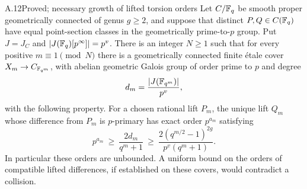 \begin{claim}{A.12}{Proved; necessary growth of lifted torsion orders}
Let $C/\mathbb F_q$ be smooth proper geometrically connected of genus
$g\ge2$, and suppose that distinct $P,Q\in C(\mathbb F_q)$ have equal
point-section classes in the geometrically prime-to-$p$ group.
Put $J=J_C$ and $|J(\mathbb F_q)[p^\infty]|=p^v$. There is an integer
$N\ge1$ such that for every positive $m\equiv1\pmod N$ there is
a geometrically connected finite \'etale cover
$X_m\to C_{\mathbb F_{q^m}}$, with abelian geometric Galois group of
order prime to $p$ and degree
\[
 d_m=\frac{|J(\mathbb F_{q^m})|}{p^v},
\]
with the following property. For a chosen rational lift $P_m$,
the unique lift $Q_m$ whose difference from $P_m$ is
$p$-primary has exact order $p^{a_m}$ satisfying
\[
 p^{a_m}\ \ge\ \frac{2d_m}{q^m+1}
 \ \ge\ \frac{2(q^{m/2}-1)^{2g}}{p^v(q^m+1)}.                    \tag{A.8}
\]
In particular these orders are unbounded. A uniform bound on
the orders of compatible lifted differences, if established
on these covers, would contradict a collision.
\end{claim}
